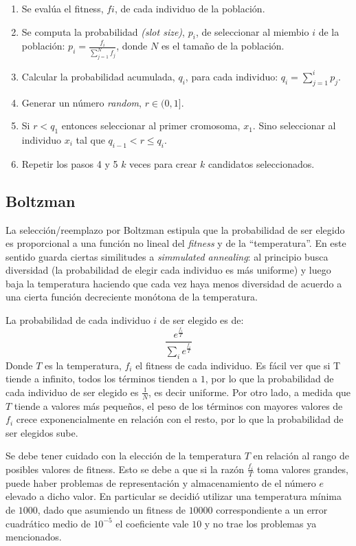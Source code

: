 \documentclass[%
    final,
    reprint,
    notitlepage,
    narroweqnarray,
    inline,
    twoside,
    invited
    ]{ieee}
\begin{document}
\begin{enumerate}

\item Se evalúa el fitness, $fi$, de cada individuo de la población.
\item Se computa la probabilidad \textit{(slot size)}, $p_i$, de seleccionar al miembio $i$ de la población:	$p_i=\frac{f_i}{\sum_{j=1}^{N}{f_j}}$, donde $N$ es el tamaño de la población.
\item Calcular la probabilidad acumulada, $q_i$, para cada individuo: $q_i=\sum_{j=1}^{i}{p_j}$.
\item Generar un número \textit{random}, $r \in (0, 1]$.
\item Si $r < q_1$ entonces seleccionar al primer cromosoma, $x_1$. Sino seleccionar al individuo $x_i$ tal que $q_{i-1} < r \leq q_i$. 
\item Repetir los pasos 4 y 5 $k$ veces para crear $k$ candidatos seleccionados.
\end{enumerate}

\subsection{Boltzman}

\par La selección/reemplazo por Boltzman estipula que la probabilidad 
de ser elegido es proporcional a una función no 
lineal del \textit{fitness} y de la ``temperatura''. 
En este sentido guarda ciertas similitudes a \textit{simmulated annealing}: al 
principio busca diversidad (la probabilidad de elegir cada individuo es más uniforme) 
y luego baja la temperatura haciendo que cada 
vez haya menos diversidad de acuerdo a una cierta función decreciente monótona de la temperatura. 
\par La probabilidad de cada individuo $i$ de ser elegido es de:
\[ \frac{e^{\frac{f_i}{T}}}{\sum_{i}e^{\frac{f_i}{T}}} \]
Donde $T$ es la temperatura, $f_i$ el fitness de cada individuo. Es fácil ver que si T tiende a infinito, todos 
los términos tienden a $1$, por lo que la probabilidad de cada individuo de ser elegido es $\frac{1}{N}$, es decir 
uniforme. Por otro lado, a medida que $T$ tiende a valores más pequeños, el peso de los términos con mayores 
valores de $f_i$ crece exponencialmente en relación con el resto, por lo que la probabilidad de ser elegidos 
sube. 
\par Se debe tener cuidado con la elección de la temperatura $T$ en relación al rango de posibles valores de 
fitness. Esto se debe a que si la razón $\frac{f_i}{T}$ toma valores grandes, puede haber problemas 
de representación y almacenamiento de el número $e$ elevado a dicho valor. En particular se decidió utilizar 
una temperatura mínima de $1000$, dado que asumiendo un fitness de $10000$ correspondiente a un error 
cuadrático medio de $10^{-5}$ el coeficiente vale $10$ y no trae los problemas ya mencionados.
\end{document}
